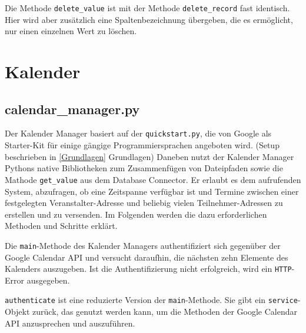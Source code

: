                 Die Methode \verb|delete_value| ist mit der Methode \verb|delete_record| fast identisch. Hier wird aber zusätzlich eine Spaltenbezeichnung übergeben, die es ermöglicht, nur einen einzelnen Wert zu löschen.


    \section{Kalender} \label{Kalender}
        
        \subsection{calendar\_manager.py} \label{calendar_manager.py}
        Der Kalender Manager basiert auf der \verb|quickstart.py|, die von Google als Starter-Kit für einige gängige Programmiersprachen angeboten wird. (Setup beschrieben in \ref{Grundlagen} Grundlagen) Daneben nutzt der Kalender Manager Pythons native Bibliotheken zum Zusammenfügen von Dateipfaden sowie die Mathode \verb|get_value| aus dem Database Connector. Er erlaubt es dem aufrufenden System, abzufragen, ob eine Zeitspanne verfügbar ist und Termine zwischen einer festgelegten Veranstalter-Adresse und beliebig vielen Teilnehmer-Adressen zu erstellen und zu versenden. Im Folgenden werden die dazu erforderlichen Methoden und Schritte erklärt. 


                Die \verb|main|-Methode des Kalender Managers authentifiziert sich gegenüber der Google Calendar API und versucht daraufhin, die nächsten zehn Elemente des Kalenders auszugeben. Ist die Authentifizierung nicht erfolgreich, wird ein \verb|HTTP|-Error ausgegeben. 

            
                \verb|authenticate| ist eine reduzierte Version der \verb|main|-Methode. Sie gibt ein \verb|service|-Objekt zurück, das genutzt werden kann, um die Methoden der Google Calendar API anzusprechen und auszuführen. 
      

